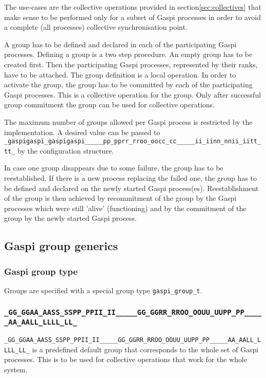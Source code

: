 \documentclass[a4paper]{article}
\makeatletter
\newcommand{\secref}[1]{section\xspace\ref{#1}}
\newlength{\st}\setlength{\st}{0pt}
\newcommand{\zerowsep}{\hskip 0pt plus 0.1pt minus 0.1pt}
\newcommand{\ZSEP}[1]{\ifx#1\@@@EOZ@@@\let\next\relax\else\ifx#1\_#1\zerowsep\else#1\fi\let\next\ZSEP\fi\next}
\newcommand{\zsep}[1]{\ZSEP{}#1\@@@EOZ@@@}
\newcommand{\gaspiprefix}{gaspi}
\newcommand{\GASPI}{{\sc Gaspi}}
\newcommand{\function}[1]{{\tt #1}}
\newcommand{\gaspifunction}[1]{\function{\protect\zsep{\gaspiprefix\_#1}}}
\newcommand{\GASPIGROUPALL}{{\tt\protect\zsep{GASPI\_GROUP\_ALL}}}
\makeatother
\begin{document}
The use-cases are the collective operations provided in \secref{sec:collectives}
that make sense to be performed only for a subset of \GASPI{} processes
in order to avoid a complete (all processes) collective synchronisation
point.

A group has to be defined and declared in each of the participating
\GASPI{} processes. Defining a group is a two step procedure.
An empty group has to be created first. Then the participating \GASPI{}
processes, represented by their ranks, have to be attached. The group
definition is a local operation.  In order to activate the group, the
group has to be committed by each of the participating \GASPI{}
processes. This is a collective operation for the group. Only after
successful group commitment the group can be used for collective
operations.

The maximum number of groups allowed per \GASPI{} process is restricted by the
implementation. A desired value can be passed to \gaspifunction{proc\_init} by
the configuration structure.

In case one group disappears due to some failure, the group has to be
reestablished. If there is a new process replacing the failed one, the
group has to be defined and declared on the newly started \GASPI{}
process(es).  Reestablishment of the group is then achieved by
recommitment of the group by the \GASPI{} processes which were still
'alive' (functioning) and by the commitment of the group by the newly started \GASPI{}
process.

\subsection{\GASPI{} group generics}

\subsubsection{\GASPI{} group type}

Groups are specified with a special group type \verb|gaspi_group_t|.

\subsubsection{\GASPIGROUPALL{}}

\GASPIGROUPALL{} is a predefined default group that corresponds
to the whole set of \GASPI{} processes. This is to be used for collective
operations that work for the whole system.
\end{document}
